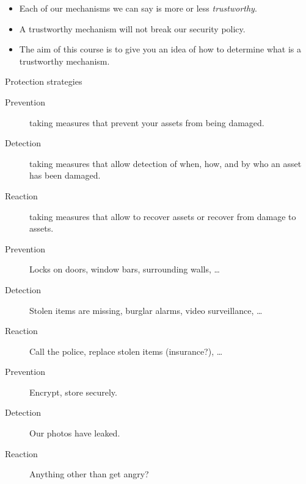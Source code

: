 \documentclass{beamer}
\begin{document}
\begin{frame}
  \begin{itemize}
    \item Each of our mechanisms we can say is more or less \emph{trustworthy}.
    \item A trustworthy mechanism will not break our security policy.

      \pause

    \item The aim of this course is to give you an idea of how to determine 
      what is a trustworthy mechanism.
  \end{itemize}
\end{frame}

\begin{frame}
  \begin{block}{Protection strategies}
    \begin{description}
      \item[Prevention] taking measures that prevent your assets from being 
        damaged.

      \item[Detection] taking measures that allow detection of when, how, and 
        by who an asset has been damaged.

      \item[Reaction] taking measures that allow to recover assets or recover 
        from damage to assets.
    \end{description}
  \end{block}
\end{frame}

\begin{frame}
  \begin{example}
    \begin{description}
      \item[Prevention] Locks on doors, window bars, surrounding walls, \dots
      \item[Detection] Stolen items are missing, burglar alarms, video 
        surveillance, \dots
      \item[Reaction] Call the police, replace stolen items (insurance?), \dots
    \end{description}
  \end{example}

  \pause

  \begin{example}
    \begin{description}
      \item[Prevention] Encrypt, store securely.
      \item[Detection] Our photos have leaked.
      \item[Reaction] Anything other than get angry?
    \end{description}
  \end{example}
\end{frame}
\end{document}
